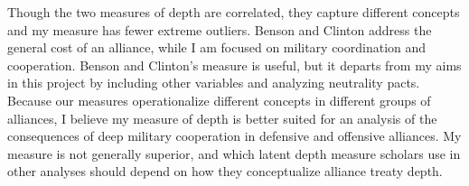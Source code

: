 \documentclass[12pt]{article}
\begin{document}
Though the two measures of depth are correlated, they capture different concepts and my measure has fewer extreme outliers. 
Benson and Clinton address the general cost of an alliance, while I am focused on military coordination and cooperation. 
Benson and Clinton's measure is useful, but it departs from my aims in this project by including other variables and analyzing neutrality pacts. 
Because our measures operationalize different concepts in different groups of alliances, I believe my measure of depth is better suited for an analysis of the consequences of deep military cooperation in defensive and offensive alliances. 
My measure is not generally superior, and which latent depth measure scholars use in other analyses should depend on how they conceptualize alliance treaty depth. 

  
 
\end{document}
